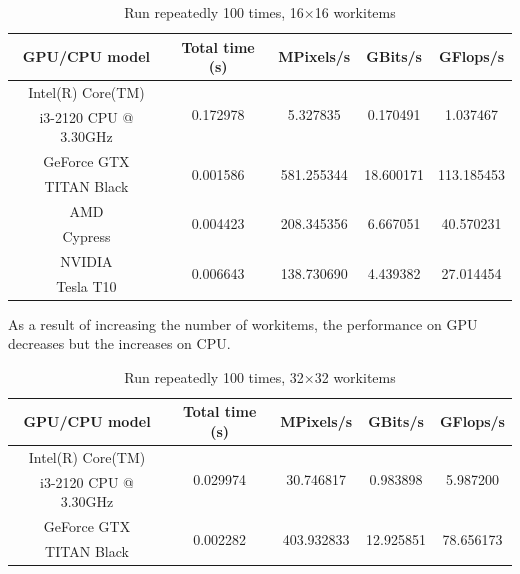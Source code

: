 \documentclass[12pt]{article}
\begin{document}
\begin{table}[h]
  \centering
  \begin{tabular}{ | c | c | c | c | c |}
    \hline
    GPU/CPU model & Total time (s) & MPixels/s & GBits/s & GFlops/s \\ \hline
     Intel(R) Core(TM)  & \multirow{2}{*}{0.172978} & \multirow{2}{*}{5.327835} & \multirow{2}{*}{0.170491}  & \multirow{2}{*}{1.037467}  \\ 
     i3-2120 CPU @ 3.30GHz & & & & \\ \hline
     GeForce GTX  & \multirow{2}{*}{0.001586} & \multirow{2}{*}{581.255344} & \multirow{2}{*}{18.600171} & \multirow{2}{*}{113.185453} \\ 
     TITAN Black & & & &  \\ \hline
    AMD &  \multirow{2}{*}{0.004423} &  \multirow{2}{*}{208.345356} &  \multirow{2}{*}{6.667051}  &  \multirow{2}{*}{40.570231} \\
    Cypress & & & & \\ \hline
    NVIDIA & \multirow{2}{*}{0.006643} & \multirow{2}{*}{138.730690} & \multirow{2}{*}{4.439382} & \multirow{2}{*}{27.014454} \\
    Tesla T10 & & & & \\ \hline
  \end{tabular}
    \caption{Run repeatedly 100 times, 16$\times$16 workitems}
\end{table}

As a result of increasing the number of workitems, the performance on GPU decreases but the increases on CPU. 
\begin{table}[h]
  \centering
  \begin{tabular}{ | c | c | c | c | c |}
    \hline
    GPU/CPU model & Total time (s) & MPixels/s & GBits/s & GFlops/s \\ \hline
     Intel(R) Core(TM)  & \multirow{2}{*}{0.029974} & \multirow{2}{*}{30.746817} & \multirow{2}{*}{0.983898}  & \multirow{2}{*}{5.987200}  \\ 
     i3-2120 CPU @ 3.30GHz & & & & \\ \hline
     GeForce GTX  & \multirow{2}{*}{0.002282} & \multirow{2}{*}{403.932833} & \multirow{2}{*}{12.925851} & \multirow{2}{*}{78.656173} \\ 
     TITAN Black & & & &  \\ \hline
    \end{tabular}
    \caption{Run repeatedly 100 times, 32$\times$32 workitems}
\end{table}
\end{document}
